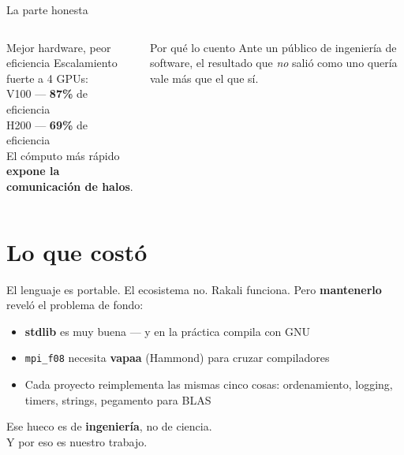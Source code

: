 \documentclass[aspectratio=169]{beamer}
\begin{document}
\begin{frame}{La parte honesta}
  \begin{columns}[T,onlytextwidth]
      \begin{alertblock}{Mejor hardware, peor eficiencia}
        {\footnotesize
        Escalamiento fuerte a 4 GPUs: \\[.3em]
        V100 --- \textbf{87\%} de eficiencia \\
        H200 --- \textbf{69\%} de eficiencia \\[.4em]
        El cómputo más rápido \textbf{expone la comunicación de halos}.}
      \end{alertblock}
      \begin{block}{Por qué lo cuento}
        {\footnotesize Ante un público de ingeniería de software, el resultado que \emph{no}
        salió como uno quería vale más que el que sí.}
      \end{block}
  \end{columns}
  \vfill
\end{frame}

\section{Lo que costó}

\begin{frame}{El lenguaje es portable. El ecosistema no.}
  Rakali funciona. Pero \textbf{mantenerlo} reveló el problema de fondo:
  \vspace{.5em}
  \begin{itemize}\setlength\itemsep{4pt}
    \item \textbf{stdlib} es muy buena --- y en la práctica compila con GNU
    \item \texttt{mpi\_f08} necesita \textbf{vapaa} (Hammond) para cruzar compiladores
    \item Cada proyecto reimplementa las mismas cinco cosas: ordenamiento, logging,
      timers, strings, pegamento para BLAS
  \end{itemize}
  \vfill
  \begin{exampleblock}{}
    \centering Ese hueco es de \textbf{ingeniería}, no de ciencia. \\
    {\footnotesize Y por eso es nuestro trabajo.}
  \end{exampleblock}
\end{frame}
\end{document}
